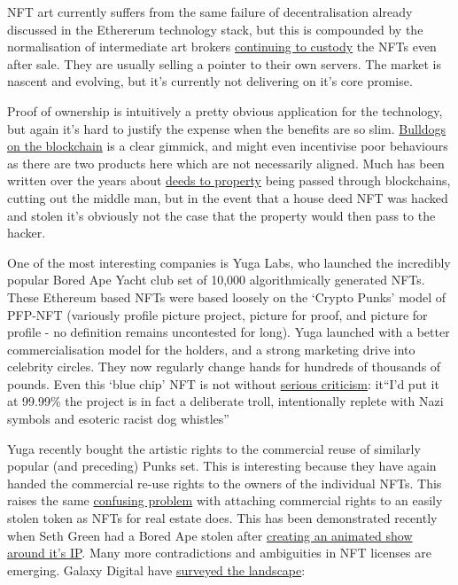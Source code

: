 NFT art currently suffers from the same failure of decentralisation already discussed in the Ethererum technology stack, but this is compounded by the normalisation of intermediate art brokers \href{https://moxie.org/2022/01/07/web3-first-impressions.html}{continuing to custody} the NFTs even after sale. They are usually selling a pointer to their own servers. The market is nascent and evolving, but it's currently not delivering on it's core promise.\par
Proof of ownership is intuitively a pretty obvious application for the technology, but again it's hard to justify the expense when the benefits are so slim. \href{https://www.bullishlybred.com/}{Bulldogs on the blockchain} is a clear gimmick, and might even incentivise poor behaviours as there are two products here which are not necessarily aligned. Much has been written over the years about \href{https://propy.com/browse/propy-nft/}{deeds to property} being passed through blockchains, cutting out the middle man, but in the event that a house deed NFT was hacked and stolen it's obviously not the case that the property would then pass to the hacker.\par 
One of the most interesting companies is Yuga Labs, who launched the incredibly popular Bored Ape Yacht club set of 10,000 algorithmically generated NFTs. These Ethereum based NFTs were based loosely on the `Crypto Punks' model of PFP-NFT (variously profile picture project, picture for proof, and picture for profile - no definition remains uncontested for long). Yuga launched with a better commercialisation model for the holders, and a strong marketing drive into celebrity circles. They now regularly change hands for hundreds of thousands of pounds. Even this `blue chip' NFT is not without \href{https://twitter.com/coryklippsten/status/1538909505236283392}{serious criticism}: it{``I'd put it at 99.99\% the project is in fact a deliberate troll, intentionally replete with Nazi symbols and esoteric racist dog whistles''}\par
Yuga recently bought the artistic rights to the commercial reuse of similarly popular (and preceding) Punks set. This is interesting because they have again handed the commercial re-use rights to the owners of the individual NFTs. This raises the same \href{https://www.bloomberg.com/news/articles/2022-03-21/bored-ape-nft-spinoff-venture-gone-sour-sparks-legal-fight}{confusing problem} with attaching commercial rights to an easily stolen token as NFTs for real estate does. This has been demonstrated recently when Seth Green had a Bored Ape stolen after \href{https://www.buzzfeednews.com/article/sarahemerson/seth-green-bored-ape-stolen-tv-show}{creating an animated show around it's IP}. Many more contradictions and ambiguities in NFT licenses are emerging. Galaxy Digital have \href{https://www.galaxy.com/research/insights/a-survey-of-nft-licenses-facts-and-fictions/}{surveyed the landscape}:
